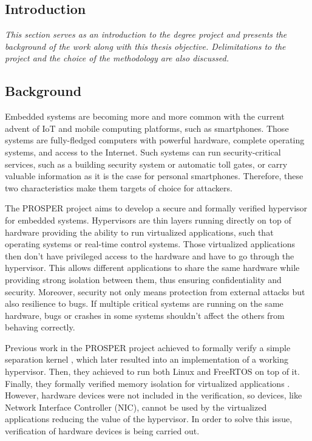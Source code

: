 \documentclass[10pt,a4paper]{article}
\begin{document}
\begin{multicols}{2}

\section{Introduction}
\textit{This section serves as an introduction to the degree project and presents the background of the work along with this thesis objective. Delimitations to the project and the choice of the methodology are also discussed.}

\subsection{Background}

Embedded systems are becoming more and more common with the current advent of {IoT} and mobile computing platforms, such as smartphones. Those systems are fully-fledged computers with powerful hardware, complete operating systems, and access to the Internet. Such systems can run security-critical services, such as a building security system or automatic toll gates, or carry valuable information as it is the case for personal smartphones. Therefore, these two characteristics make them targets of choice for attackers.

The {PROSPER} project \cite{noauthor_prosper:_nodate-1} aims to develop a secure and formally verified hypervisor for embedded systems. Hypervisors are thin layers running directly on top of hardware providing the ability to run virtualized applications, such that operating systems or real-time control systems. Those virtualized applications then don't have privileged access to the hardware and have to go through the hypervisor. This allows different applications to share the same hardware while providing strong isolation between them, thus ensuring confidentiality and security. Moreover, security not only means protection from external attacks but also resilience to bugs. If multiple critical systems are running on the same hardware, bugs or crashes in some systems shouldn't affect the others from behaving correctly.

Previous work in the {PROSPER} project achieved to formally verify a simple separation kernel \cite{dam_formal_2013}, which later resulted into an implementation of a working hypervisor. Then, they achieved to run both Linux and {FreeRTOS} on top of it. Finally, they formally verified memory isolation for virtualized applications \cite{nemati_trustworthy_2015}. However, hardware devices were not included in the verification, so devices, like Network Interface Controller ({NIC}), cannot be used by the virtualized applications reducing the value of the hypervisor. In order to solve this issue, verification of hardware devices is being carried out.


\end{multicols}
\end{document}
